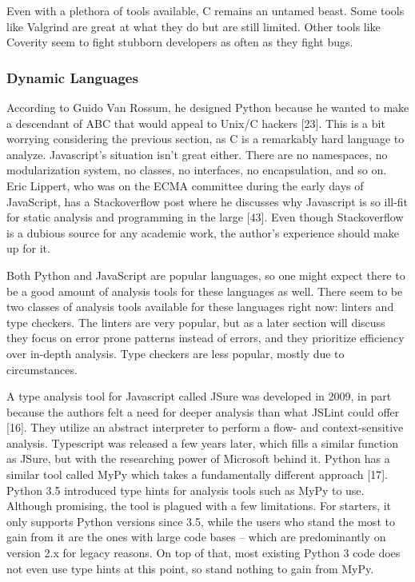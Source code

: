 \documentclass[a4paper, 16pt, oneside]{Thesis}
\begin{document}
Even with a plethora of tools available, C remains an untamed beast.
Some tools like Valgrind are great at what they do but are still
limited. Other tools like Coverity seem to fight stubborn developers as
often as they fight bugs.

\subsubsection{Dynamic Languages}\label{dynamic-languages}

According to Guido Van Rossum, he designed Python because he wanted to
make a descendant of ABC that would appeal to Unix/C hackers {[}23{]}.
This is a bit worrying considering the previous section, as C is a
remarkably hard language to analyze. Javascript's situation isn't great
either. There are no namespaces, no modularization system, no classes,
no interfaces, no encapsulation, and so on. Eric Lippert, who was on the
ECMA committee during the early days of JavaScript, has a Stackoverflow
post where he discusses why Javascript is so ill-fit for static analysis
and programming in the large {[}43{]}. Even though Stackoverflow is a
dubious source for any academic work, the author's experience should
make up for it.

Both Python and JavaScript are popular languages, so one might expect
there to be a good amount of analysis tools for these languages as well.
There seem to be two classes of analysis tools available for these
languages right now: linters and type checkers. The linters are very
popular, but as a later section will discuss they focus on error prone
patterns instead of errors, and they prioritize efficiency over in-depth
analysis. Type checkers are less popular, mostly due to circumstances.

A type analysis tool for Javascript called JSure was developed in 2009,
in part because the authors felt a need for deeper analysis than what
JSLint could offer {[}16{]}. They utilize an abstract interpreter to
perform a flow- and context-sensitive analysis. Typescript was released
a few years later, which fills a similar function as JSure, but with the
researching power of Microsoft behind it. Python has a similar tool
called MyPy which takes a fundamentally different approach {[}17{]}.
Python 3.5 introduced type hints for analysis tools such as MyPy to use.
Although promising, the tool is plagued with a few limitations. For
starters, it only supports Python versions since 3.5, while the users
who stand the most to gain from it are the ones with large code bases --
which are predominantly on version 2.x for legacy reasons. On top of
that, most existing Python 3 code does not even use type hints at this
point, so stand nothing to gain from MyPy.
\end{document}
